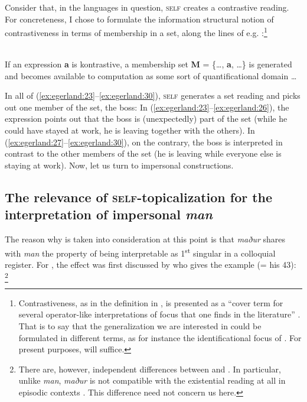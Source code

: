 \documentclass[output=paper]{LSP/langsci}
\begin{document}
Consider that, in the languages in question, \textsc{self} creates a contrastive reading. For concreteness, I chose to formulate the information structural notion of contrastiveness in terms of membership in a set, along the lines of e.g. \citet{VallduvíVilkuna1998}:\footnote{Contrastiveness, as in the definition in , is presented as a “cover term for several operator-like interpretations of focus that one finds in the literature” \citep[83]{VallduvíVilkuna1998}. That is to say that the generalization we are interested in could be formulated in different terms, as for instance the identificational focus of \citet{Kiss1998}. For present purposes,  will suffice.}

\ea\label{ex:egerland:31}
\citep[83]{VallduvíVilkuna1998}\\
If an expression \textbf{a} is kontrastive, a membership set \textbf{M} = \{…, \textbf{a}, …\} is generated and becomes available to  computation as some sort of quantificational domain …
\z

In all of (\ref{ex:egerland:23}--\ref{ex:egerland:30}), \textsc{self} generates a set reading and picks out one member of the set, the boss: In (\ref{ex:egerland:23}--\ref{ex:egerland:26}), the expression points out that the boss is (unexpectedly) part of the set (while he could have stayed at work, he is leaving together with the others). In (\ref{ex:egerland:27}--\ref{ex:egerland:30}), on the contrary, the boss is interpreted in contrast to the other members of the set (he is leaving while everyone else is staying at work). Now, let us turn to impersonal constructions.

\newpage 
\subsection{The relevance of \textsc{self}-topicalization for the interpretation of impersonal \textit{man}}\label{sec:egerland:4.2}

The reason why  is taken into consideration at this point is that  \textit{maður} shares with  \textit{man} the property of being interpretable as 1\textsuperscript{st} singular in a colloquial register. For , the effect was first discussed by \citet{Jónsson1992} who gives the example  (= his 43): \footnote{There are, however, independent differences between  and . In particular, unlike  \textit{man},  \textit{maður} is not compatible with the existential reading at all in episodic contexts \citep{Jónsson1992,Egerland2003romance,SigurðssonEgerland2009}. This difference need not concern us here.}
\end{document}
